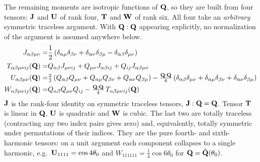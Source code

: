 \documentclass[a5paper]{article}
\begin{document}
The remaining moments are isotropic functions of $\mathbf{Q}$, so they are built from four tensors: $\mathbf{J}$ and $\mathbf{U}$ of rank four, $\mathbf{T}$ and $\mathbf{W}$ of rank six. All four take an \emph{arbitrary} symmetric traceless argument. With $\mathbf{Q}:\mathbf{Q}$ appearing explicitly, no normalization of the argument is assumed anywhere below.
\begin{subequations}
    \label{tensor-definitions}
\begin{align}
    \label{j-definition}
    J_{{\alpha\beta\mu\nu}} =& \frac{1}{2}\left(\delta_{\alpha\mu}\delta_{\beta\nu} + \delta_{\alpha\nu}\delta_{\beta\mu} - \delta_{\alpha\beta}\delta_{\mu\nu}\right)
    \\
    T_{{\alpha\beta\mu\nu} ij}(\mathbf{Q}) =& Q_{\alpha\beta}J_{\mu\nu ij} + Q_{\mu\nu}J_{\alpha\beta ij} + Q_{ij}J_{{\alpha\beta\mu\nu}}
    \\
    \label{U-general}
    U_{{\alpha\beta\mu\nu}}(\mathbf{Q}) =& \tfrac{2}{3} \left(Q_{\alpha\beta}Q_{\mu\nu} + Q_{\alpha\mu}Q_{\beta\nu} + Q_{\alpha\nu}Q_{\beta\mu}\right)
    - \tfrac{\mathbf{Q}:\mathbf{Q}}{6} \left(
        \delta_{\alpha\beta}\delta_{\mu\nu} + \delta_{\alpha\mu}\delta_{\beta\nu} + \delta_{\alpha\nu}\delta_{\beta\mu}
    \right)
    \\
    \label{W-general}
    W_{{\alpha\beta\mu\nu} ij}(\mathbf{Q}) =& Q_{\alpha\beta}Q_{\mu\nu}Q_{ij} - \tfrac{\mathbf{Q}:\mathbf{Q}}{4}\, T_{{\alpha\beta\mu\nu} ij}(\mathbf{Q})
\end{align}
\end{subequations}
$\mathbf{J}$ is the rank-four identity on symmetric traceless tensors, $\mathbf{J}:\mathbf{Q} = \mathbf{Q}$. Tensor $\mathbf{T}$ is linear in $\mathbf{Q}$, $\mathbf{U}$ is quadratic and $\mathbf{W}$ is cubic. The last two are totally traceless (contracting any two index pairs gives zero)  and, equivalently, totally symmetric under permutations of their indices. They are the pure fourth- and sixth-harmonic tensors: on a unit argument each component collapses to a single harmonic, e.g.\ $\mathbf{U}_{1111} = \cos4\theta_0$ and $W_{111111} = \tfrac14 \cos 6\theta_0$ for $\mathbf{Q} = \hat{\mathbf{Q}}(\theta_0)$.
\end{document}
